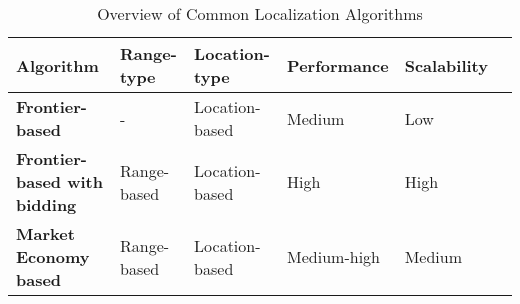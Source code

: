 \begin{table}[H]
	\renewcommand{\arraystretch}{1.3}
	\caption{Overview of Common Localization Algorithms}
	\label{table_alg_exploration}
	\centering

    \begin{tabular}{|l|l|l|l|l|l|}
	    \hline
	    \bfseries Algorithm & \bfseries Range-type & \bfseries Location-type & \bfseries Performance & \bfseries Scalability\\
	    \hline
	    \bfseries Frontier-based & - & Location-based & Medium & Low\\
	    \hline
	    \bfseries Frontier-based with bidding & Range-based & Location-based & High & High\\
	    \hline
	    \bfseries Market Economy based & Range-based & Location-based & Medium-high & Medium\\
	    \hline
    \end{tabular}
\end{table}













